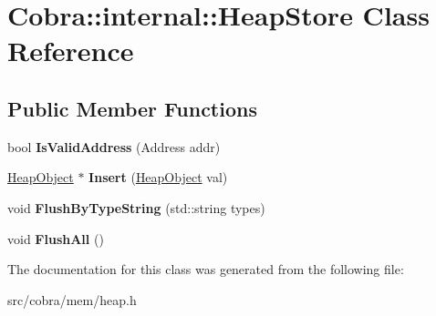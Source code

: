 \hypertarget{class_cobra_1_1internal_1_1_heap_store}{\section{Cobra\+:\+:internal\+:\+:Heap\+Store Class Reference}
\label{class_cobra_1_1internal_1_1_heap_store}
}
\subsection*{Public Member Functions}
\begin{DoxyCompactItemize}
\item 
\hypertarget{class_cobra_1_1internal_1_1_heap_store_a156ca7e0cc04f159ef58e0fe4d114639}{bool {\bfseries Is\+Valid\+Address} (Address addr)}\label{class_cobra_1_1internal_1_1_heap_store_a156ca7e0cc04f159ef58e0fe4d114639}

\item 
\hypertarget{class_cobra_1_1internal_1_1_heap_store_adcf5e620d5f98a2162a70075f60190dc}{\hyperlink{struct_cobra_1_1internal_1_1_heap_object}{Heap\+Object} $\ast$ {\bfseries Insert} (\hyperlink{struct_cobra_1_1internal_1_1_heap_object}{Heap\+Object} val)}\label{class_cobra_1_1internal_1_1_heap_store_adcf5e620d5f98a2162a70075f60190dc}

\item 
\hypertarget{class_cobra_1_1internal_1_1_heap_store_a22c405bbd4db21e701296615964423ac}{void {\bfseries Flush\+By\+Type\+String} (std\+::string types)}\label{class_cobra_1_1internal_1_1_heap_store_a22c405bbd4db21e701296615964423ac}

\item 
\hypertarget{class_cobra_1_1internal_1_1_heap_store_a99373fbcab7dd825cd6255743317329c}{void {\bfseries Flush\+All} ()}\label{class_cobra_1_1internal_1_1_heap_store_a99373fbcab7dd825cd6255743317329c}

\end{DoxyCompactItemize}


The documentation for this class was generated from the following file\+:\begin{DoxyCompactItemize}
\item 
src/cobra/mem/heap.\+h\end{DoxyCompactItemize}
